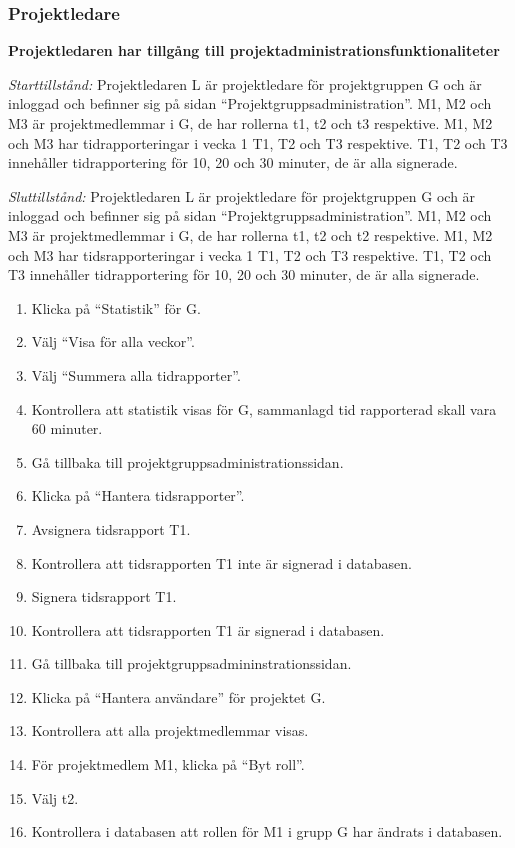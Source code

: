 \documentclass[a4paper]{article}
\begin{document}
\begin{ST}
\begin{enumerate}
\end{enumerate}

\end{ST}

\subsubsection{Projektledare}
\begin{ST}
\item \textbf{Projektledaren har tillgång till projektadministrationsfunktionaliteter}

\emph{Starttillstånd:} Projektledaren L är projektledare för projektgruppen G och är inloggad och befinner sig på sidan ``Projektgruppsadministration''. M1, M2 och M3 är projektmedlemmar i G, de har rollerna t1, t2 och t3 respektive. M1, M2 och M3 har tidrapporteringar i vecka 1 T1, T2 och T3 respektive. T1, T2 och T3 innehåller tidrapportering för 10, 20 och 30 minuter, de är alla signerade.

\emph{Sluttillstånd:} Projektledaren L är projektledare för projektgruppen G och är inloggad och befinner sig på sidan ``Projektgruppsadministration''. M1, M2 och M3 är projektmedlemmar i G, de har rollerna t1, t2 och t2 respektive. M1, M2 och M3 har tidsrapporteringar i vecka 1 T1, T2 och T3 respektive. T1, T2 och T3 innehåller tidrapportering för 10, 20 och 30 minuter, de är alla signerade.

\begin{enumerate}
\item Klicka på ``Statistik'' för G.
\item Välj ``Visa för alla veckor''.
\item Välj ``Summera alla tidrapporter''.
\item Kontrollera att statistik visas för G, sammanlagd tid rapporterad skall vara 60 minuter.
\item Gå tillbaka till projektgruppsadministrationssidan.
\item Klicka på ``Hantera tidsrapporter''.
\item Avsignera tidsrapport T1.
\item Kontrollera att tidsrapporten T1 inte är signerad i databasen.
\item Signera tidsrapport T1.
\item Kontrollera att tidsrapporten T1 är signerad i databasen.
\item Gå tillbaka till projektgruppsadmininstrationssidan.
\item Klicka på ``Hantera användare'' för projektet G.
\item Kontrollera att alla projektmedlemmar visas.
\item För projektmedlem M1, klicka på ``Byt roll''.
\item Välj t2.
\item Kontrollera i databasen att rollen för M1 i grupp G har ändrats i databasen.
\end{enumerate}
\end{ST}
\end{document}
